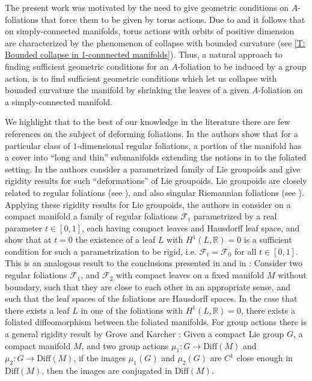 \documentclass[12pt,a4paper,reqno]{amsart}
\theoremstyle{definition}
\numberwithin{equation}{section}
\newcommand{\fol}{\mathcal{F}}
\newcommand{\R}{\mathbb{R}} %
\begin{document}
The present work was motivated by the need to give geometric conditions on $A$-foliations that force them to be given by torus actions. Due to \cite{CheegerFukayaGromov1992} and \cite{Rong1996} it follows that on simply-connected manifolds, torus actions with orbits of positive dimension are characterized by the phenomenon of collapse with bounded curvature (see \th\ref{T: Bounded collapse in 1-connnected manifolds}). Thus, a natural approach to finding sufficient geometric conditions for an $A$-foliation to be induced by a group action, is to  find sufficient geometric conditions which let us collapse with bounded curvature the manifold by shrinking  the leaves of a given $A$-foliation on a simply-connected manifold. 

We highlight  that to the best of our knowledge in the literature there are few references on the subject of deforming foliations. In \cite{FarrellJones1998} the authors show that for a particular class of $1$-dimensional regular foliations, a portion of the manifold has a cover into ``long and thin'' submanifolds extending the notions in \cite{CheegerFukayaGromov1992} to the foliated setting. In \cite{CranicMestreStruchiner2020} the authors consider a parametrized family of Lie groupoids and give  rigidity results for such ``deformations'' of Lie groupoids. Lie groupoids are closely related to regular foliations (see \cite{MoerdijkMrcun2003}), and also singular Riemannian foliations (see \cite{AlexandrinoInagakideMeloStruchiner2022}). Applying these rigidity results for Lie groupoids,  the authors in \cite{delHoyoFernandes2019} consider on a compact manifold a family of regular foliations  $\fol_t$ parametrized by a real parameter $t\in [0,1]$, each having compact leaves and Hausdorff leaf space, and show that at $t=0$ the existence of a leaf $L$ with $H^1(L,\R) =0$ is a sufficient condition for such a parametrization to be rigid, i.e. $\fol_t = \fol_0$ for all $t\in [0,1]$. This is an analogous result to the conclusions presented in \cite{EpsteinRosenberg1977} and in \cite{Hamilton1978}:  Consider two regular foliations $\fol_1$, and $\fol_2$ with compact leaves on a fixed  manifold $M$ without boundary, such that they are close to each other in an appropriate sense, and such that the leaf spaces of the foliations are Hausdorff  spaces. In the case that there exists a leaf $L$ in one of the  foliations with $H^1(L,\R) =0$,  there exists a foliated diffeomorphism between the foliated manifolds. For group actions there is a general rigidity result by Grove and Karcher \cite{GroveKarcher1973}: Given a compact Lie group $G$, a compact manifold $M$, and two group actions $\mu_1\colon G\to\mathrm{Diff}(M)$ and $\mu_2\colon G\to \mathrm{Diff}(M)$, if the images $\mu_1(G)$ and $\mu_2(G)$ are $C^1$ close enough in $\mathrm{Diff}(M)$, then the images are conjugated in $\mathrm{Diff}(M)$.
\end{document}
